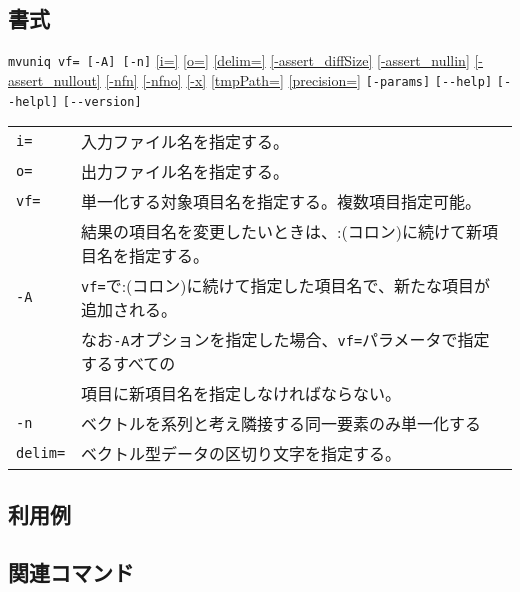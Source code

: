 \subsection*{書式}
\verb|mvuniq vf= [-A] [-n]|
\hyperref[sect:option_i]{[i=]}
\hyperref[sect:option_o]{[o=]}
\hyperref[sect:option_delim]{[delim=]} 
\hyperref[sect:option_assert_diffSize]{[-assert\_diffSize]}
\hyperref[sect:option_assert_nullin]{[-assert\_nullin]}
\hyperref[sect:option_assert_nullout]{[-assert\_nullout]}
\hyperref[sect:option_nfn]{[-nfn]} 
\hyperref[sect:option_nfno]{[-nfno]}  
\hyperref[sect:option_x]{[-x]}
\hyperref[sect:option_option_tmppath]{[tmpPath=]}
\hyperref[sect:option_precision]{[precision=]}
\verb|[-params]|
\verb|[--help]|
\verb|[--helpl]|
\verb|[--version]|\\

\begin{table}[htbp]
{\small
\begin{tabular}{ll}
\verb|i=|    & 入力ファイル名を指定する。\\
\verb|o=|    & 出力ファイル名を指定する。\\
\verb|vf=| & 単一化する対象項目名を指定する。複数項目指定可能。 \\
           & 結果の項目名を変更したいときは、:(コロン)に続けて新項目名を指定する。\\
\verb|-A|  & \verb|vf=|で:(コロン)に続けて指定した項目名で、新たな項目が追加される。\\
           & なお\verb|-A|オプションを指定した場合、\verb|vf=|パラメータで指定するすべての\\
           & 項目に新項目名を指定しなければならない。\\
\verb|-n|  & ベクトルを系列と考え隣接する同一要素のみ単一化する \\
\verb|delim=| & ベクトル型データの区切り文字を指定する。\\
\end{tabular}
}
\end{table} 

\subsection*{利用例}

\subsection*{関連コマンド}

%
